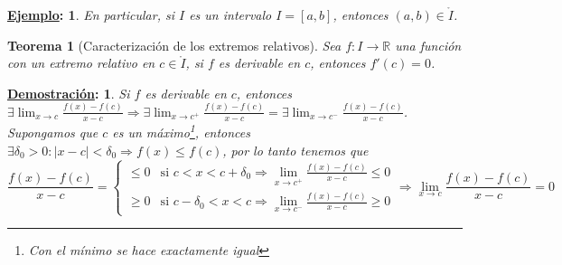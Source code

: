 \documentclass[10pt,a4paper,openright]{book}
\theoremstyle{break}
\newtheorem*{theo}{Teorema}
\newtheorem*{demo}{\underline{Demostración}:}
\newtheorem*{ej}{\underline{Ejemplo}:}
\begin{document}
\begin{ej}
En particular, si $I$ es un intervalo $I=[a,b]$, entonces $(a,b)\in \mathring{I}$.
\end{ej}

\begin{theo}[Caracterización de los extremos relativos]
Sea $f: I\rightarrow \mathbb R$ una función con un extremo relativo en $c\in \mathring{I}$, si $f$ es derivable en $c$, entonces $f'(c)=0$.
\end{theo}
\begin{demo}
Si $f$ es derivable en $c$, entonces $\exists \lim_{x\rightarrow c} \frac{f(x)-f(c)}{x-c}\Rightarrow \exists \lim_{x\rightarrow c^+} \frac{f(x)-f(c)}{x-c} = \exists \lim_{x\rightarrow c^-} \frac{f(x)-f(c)}{x-c}$. Supongamos que $c$ es un máximo\footnote{Con el mínimo se hace exactamente igual}, entonces $\exists\delta_0 >0 : |x-c|<\delta_0\Rightarrow f(x)\leq f(c)$, por lo tanto tenemos que
$$\frac{f(x)-f(c)}{x-c}=\begin{cases}\leq 0 &\mbox{si } c<x<c+\delta_0  \Rightarrow \lim_{x\rightarrow c^+}\frac{f(x)-f(c)}{x-c} \leq 0\\ \geq 0 &\mbox{si } c-\delta_0 < x <c  \Rightarrow \lim_{x\rightarrow c^-}\frac{f(x)-f(c)}{x-c} \geq 0\end{cases}\Rightarrow \lim_{x\rightarrow c}\frac{f(x)-f(c)}{x-c}= 0$$
\end{demo}
\end{document}
